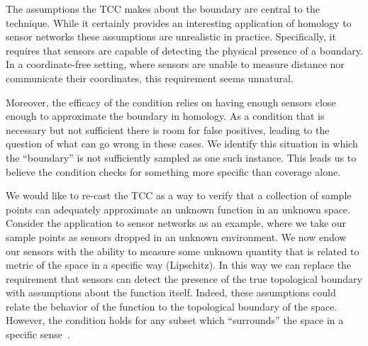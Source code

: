 
%

The assumptions the TCC makes about the boundary are central to the technique.
While it certainly provides an interesting application of homology to sensor networks these assumptions are unrealistic in practice.
Specifically, it requires that sensors are capable of detecting the physical presence of a boundary.
In a coordinate-free setting, where sensors are unable to measure distance nor communicate their coordinates, this requirement seems unnatural.

Moreover, the efficacy of the condition relies on having enough sensors close enough to approximate the boundary in homology.
As a condition that is necessary but not sufficient there is room for false positives, leading to the question of what can go wrong in these cases.
We identify this situation in which the ``boundary'' is not sufficiently sampled as one such instance.
This leads us to believe the condition checks for something more specific than coverage alone.

We would like to re-cast the TCC as a way to verify that a collection of sample points can adequately approximate an unknown function in an unknown space.
Consider the application to sensor networks as an example, where we take our sample points as sensors dropped in an unknown environment.
We now endow our sensors with the ability to measure some unknown quantity that is related to metric of the space in a specific way (Lipschitz).
In this way we can replace the requirement that sensors can detect the presence of the true topological boundary with assumptions about the function itself.
Indeed, these assumptions could relate the behavior of the function to the topological boundary of the space.
However, the condition holds for any subset which ``surrounds'' the space in a specific sense~\cite{cavanna2017when}.

